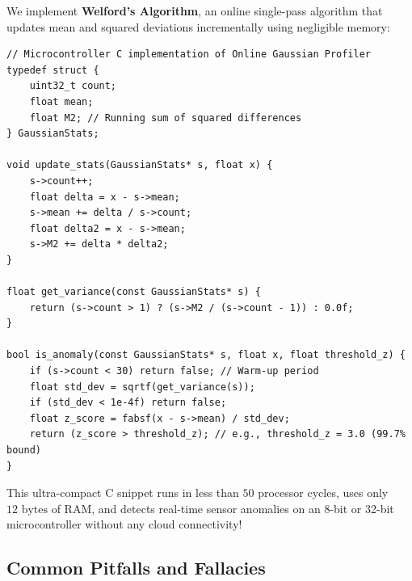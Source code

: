 \begin{iotbox}
We implement \textbf{Welford's Algorithm}, an online single-pass algorithm that updates mean and squared deviations incrementally using negligible memory:
\begin{lstlisting}[style=pythonstyle]
// Microcontroller C implementation of Online Gaussian Profiler
typedef struct {
    uint32_t count;
    float mean;
    float M2; // Running sum of squared differences
} GaussianStats;

void update_stats(GaussianStats* s, float x) {
    s->count++;
    float delta = x - s->mean;
    s->mean += delta / s->count;
    float delta2 = x - s->mean;
    s->M2 += delta * delta2;
}

float get_variance(const GaussianStats* s) {
    return (s->count > 1) ? (s->M2 / (s->count - 1)) : 0.0f;
}

bool is_anomaly(const GaussianStats* s, float x, float threshold_z) {
    if (s->count < 30) return false; // Warm-up period
    float std_dev = sqrtf(get_variance(s));
    if (std_dev < 1e-4f) return false;
    float z_score = fabsf(x - s->mean) / std_dev;
    return (z_score > threshold_z); // e.g., threshold_z = 3.0 (99.7% bound)
}
\end{lstlisting}
This ultra-compact C snippet runs in less than $50$ processor cycles, uses only $12\text{ bytes}$ of RAM, and detects real-time sensor anomalies on an 8-bit or 32-bit microcontroller without any cloud connectivity!
\end{iotbox}

\subsection{Common Pitfalls and Fallacies}\label{subsec:prob_pitfalls}

